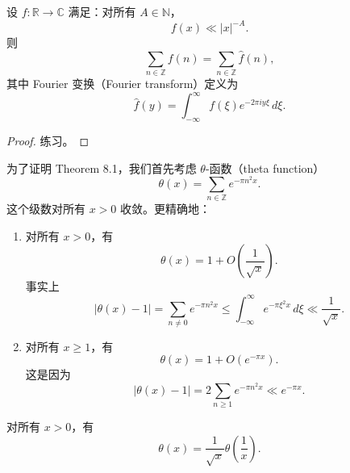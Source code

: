 \begin{theorem}
	设 $f:\mathbb R\to\mathbb C$ 满足：对所有 $A\in\mathbb N$，
	\[
		f(x)\ll |x|^{-A}.
	\]
	则
	\[
		\sum_{n\in\mathbb Z}f(n)
		=
		\sum_{n\in\mathbb Z}\widehat f(n),
	\]
	其中 Fourier 变换（Fourier transform）定义为
	\[
		\widehat f(y)
		=
		\int_{-\infty}^{\infty}
		f(\xi)e^{-2\pi i y\xi}\,d\xi.
	\]
\end{theorem}

\begin{proof}
	练习。
\end{proof}

为了证明 Theorem 8.1，我们首先考虑 $\theta$-函数（theta function）
\[
	\theta(x)=\sum_{n\in\mathbb Z}e^{-\pi n^2 x}.
\]
这个级数对所有 $x>0$ 收敛。更精确地：

\begin{enumerate}
	\item 对所有 $x>0$，有
	\[
		\theta(x)=1+O\left(\frac{1}{\sqrt{x}}\right).
	\]
	事实上
	\[
		|\theta(x)-1|
		=
		\sum_{n\neq0}e^{-\pi n^2x}
		\leq
		\int_{-\infty}^{\infty}e^{-\pi \xi^2 x}\,d\xi
		\ll \frac1{\sqrt x}.
	\]

	\item 对所有 $x\geq1$，有
	\[
		\theta(x)=1+O(e^{-\pi x}).
	\]
	这是因为
	\[
		|\theta(x)-1|
		=
		2\sum_{n\geq1}e^{-\pi n^2x}
		\ll e^{-\pi x}.
	\]
\end{enumerate}

\begin{lemma}[原文 Lemma 8.3]
	对所有 $x>0$，有
	\[
		\theta(x)=\frac{1}{\sqrt{x}}\theta\left(\frac1x\right).
	\]
\end{lemma}

